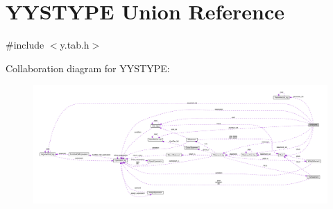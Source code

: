 \hypertarget{union_y_y_s_t_y_p_e}{}\section{Y\+Y\+S\+T\+Y\+P\+E Union Reference}
\label{union_y_y_s_t_y_p_e}


{\ttfamily \#include $<$y.\+tab.\+h$>$}



Collaboration diagram for Y\+Y\+S\+T\+Y\+P\+E\+:\nopagebreak
\begin{figure}[H]
\begin{center}
\leavevmode
\includegraphics[width=350pt]{union_y_y_s_t_y_p_e__coll__graph}
\end{center}
\end{figure}

